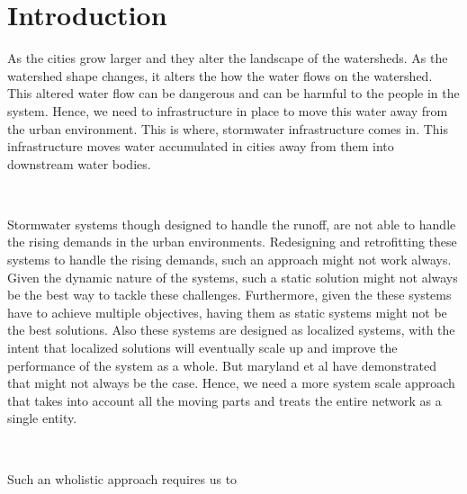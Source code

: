 \chapter{Introduction}\label{ch:introduction}
As the cities grow larger and they alter the landscape of the watersheds.
As the watershed shape changes, it alters the how the water flows on the watershed.
This altered water flow can be dangerous and can be harmful to the people in the system.
Hence, we need to infrastructure in place to move this water away from the urban environment.
This is where, stormwater infrastructure comes in.
This infrastructure moves water accumulated in cities away from them into downstream water bodies.

\

Stormwater systems though designed to handle the runoff, are not able to handle the rising demands in the urban environments. 
Redesigning and retrofitting these systems to handle the rising demands, such an approach might not work always. 
Given the dynamic nature of the systems, such a static solution might not always be the best way to tackle these challenges. 
Furthermore, given the these systems have to achieve multiple objectives, having them as static systems might not be the best solutions. 
Also these systems are designed as localized systems, with the intent that localized solutions will eventually scale up and improve the performance of the system as a whole.
But maryland et al have demonstrated that might not always be the case. 
Hence, we need a more system scale approach that takes into account all the moving parts and treats the entire network as a single entity. 

\

Such an wholistic approach requires us to 

\ 

